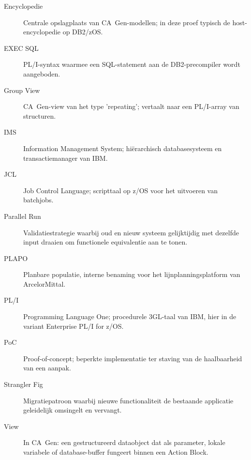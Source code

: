 \begin{description}
    \item[Encyclopedie] Centrale opslagplaats van CA~Gen-modellen; in deze proef typisch de host-encyclopedie op DB2/z\-OS.
    \item[EXEC SQL] PL/I-syntax waarmee een SQL-statement aan de DB2-precompiler wordt aangeboden.
    \item[Group View] CA~Gen-view van het type 'repeating'; vertaalt naar een PL/I-array van structuren.
    \item[IMS] Information Management System; hi\"erarchisch databasesysteem en transactiemanager van IBM.
    \item[JCL] Job Control Language; scripttaal op z/OS voor het uitvoeren van batchjobs.
    \item[Parallel Run] Validatiestrategie waarbij oud en nieuw systeem gelijktijdig met dezelfde input draaien om functionele equivalentie aan te tonen.
    \item[PLAPO] Planbare populatie, interne benaming voor het lijnplanningsplatform van ArcelorMittal.
    \item[PL/I] Programming Language One; procedurele 3GL-taal van IBM, hier in de variant Enterprise PL/I for z/OS.
    \item[PoC] Proof-of-concept; beperkte implementatie ter staving van de haalbaarheid van een aanpak.
    \item[Strangler Fig] Migratiepatroon waarbij nieuwe functionaliteit de bestaande applicatie geleidelijk omsingelt en vervangt.
    \item[View] In CA~Gen: een gestructureerd dataobject dat als parameter, lokale variabele of database-buffer fungeert binnen een Action Block.
\end{description}
